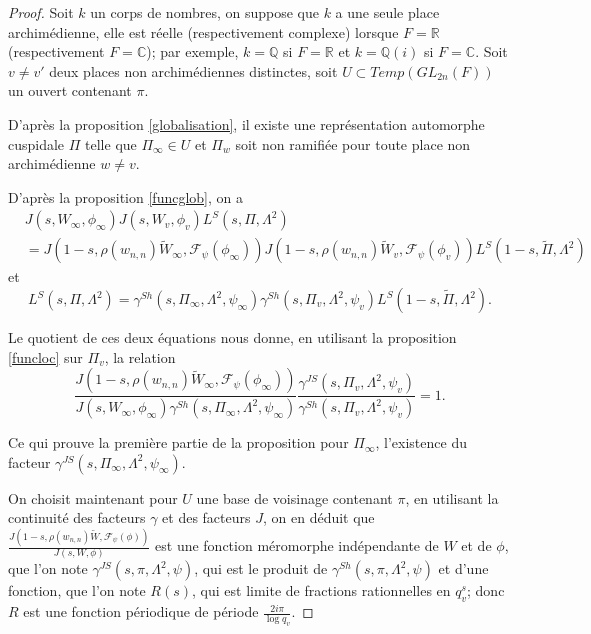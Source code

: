 \documentclass{amsart}
\begin{document}
 \begin{proof}
 Soit $k$ un corps de nombres, on suppose que $k$ a une seule place archimédienne, elle est réelle (respectivement complexe) lorsque $F=\mathbb{R}$ (respectivement $F=\mathbb{C}$); par exemple, $k=\mathbb{Q}$ si $F=\mathbb{R}$ et $k=\mathbb{Q}(i)$ si $F=\mathbb{C}$. Soit $v \neq v'$ deux places non archimédiennes distinctes, soit $U \subset Temp(GL_{2n}(F))$ un ouvert contenant $\pi$.
 
 D'après la proposition \ref{globalisation}, il existe une représentation automorphe cuspidale $\Pi$ telle que $\Pi_{\infty} \in U$ et $\Pi_w$ soit non ramifiée pour toute place non archimédienne $w \neq v$.
 
 D'après la proposition \ref{funcglob}, on a
 \begin{equation}
 \begin{split}
 &J(s, W_\infty, \phi_\infty)J(s, W_v, \phi_v)L^S(s, \Pi, \Lambda^2) \\
 &= J(1-s, \rho(w_{n,n})\tilde{W}_\infty, \mathcal{F}_\psi(\phi_\infty))J(1-s, \rho(w_{n,n})\tilde{W}_v, \mathcal{F}_\psi(\phi_v))L^S(1-s, \tilde{\Pi}, \Lambda^2)
 \end{split}
 \end{equation}
 et
 \begin{equation}
 L^S(s, \Pi, \Lambda^2) = \gamma^{Sh}(s, \Pi_\infty, \Lambda^2, \psi_\infty)\gamma^{Sh}(s, \Pi_v, \Lambda^2, \psi_v)L^S(1-s, \tilde{\Pi}, \Lambda^2).
 \end{equation}
 
 Le quotient de ces deux équations nous donne, en utilisant la proposition \ref{funcloc} sur $\Pi_v$, la relation
 \begin{equation}
 \frac{J(1-s, \rho(w_{n,n})\tilde{W}_\infty, \mathcal{F}_\psi(\phi_\infty))}{J(s, W_\infty, \phi_\infty)\gamma^{Sh}(s, \Pi_\infty, \Lambda^2, \psi_\infty)} \frac{\gamma^{JS}(s, \Pi_v, \Lambda^2, \psi_v)}{\gamma^{Sh}(s, \Pi_v, \Lambda^2, \psi_v)} = 1.
 \end{equation}
 
 Ce qui prouve la première partie de la proposition pour $\Pi_\infty$, l'existence du facteur $\gamma^{JS}(s, \Pi_\infty, \Lambda^2, \psi_\infty)$.
 
 On choisit maintenant pour $U$ une base de voisinage contenant $\pi$, en utilisant la continuité des facteurs $\gamma$ et des facteurs $J$, on en déduit que $\frac{J(1-s, \rho(w_{n,n})\tilde{W}, \mathcal{F}_\psi(\phi))}{J(s, W, \phi)}$
 est une fonction méromorphe indépendante de $W$ et de $\phi$, que l'on note $\gamma^{JS}(s, \pi, \Lambda^2, \psi)$, qui est le produit de $\gamma^{Sh}(s, \pi, \Lambda^2, \psi)$ et d'une fonction, que l'on note $R(s)$, qui est limite de fractions rationnelles en $q_v^s$; donc $R$ est une fonction périodique de période $\frac{2i\pi}{\log q_v}$.
 

\end{proof}
\end{document}
